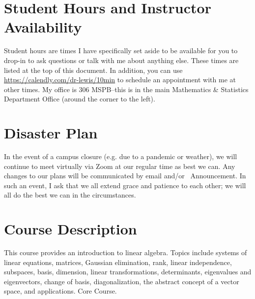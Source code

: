 \documentclass{article}
\begin{document}
\section*{\fontsize{12}{15}\selectfont Student Hours and Instructor Availability}

Student  hours are times I have specifically set aside to be available for you to drop-in to ask questions or talk with me about anything else. 
These times are listed at the top of this document. 
In addition, you can use \url{https://calendly.com/dr-lewis/10min} to schedule an appointment with me at other times. 
My office is 306 MSPB--this is in the main Mathematics \& Statistics Department Office (around the corner to the left).

\section*{\fontsize{12}{15}\selectfont Disaster Plan}
In the event of a campus closure (e.g. due to a pandemic or weather), we will continue to meet virtually via Zoom at our regular time as best we can. Any changes to our plans will be communicated by email and/or \LMS\ Announcement. In such an event, I ask that we all extend grace and patience to each other; we will all do the best we can in the circumstances.

\section*{\fontsize{12}{15}\selectfont Course Description}
This course provides an introduction to linear algebra. Topics include systems of linear equations, matrices, Gaussian elimination, rank, linear independence, subspaces, basis, dimension, linear transformations, determinants, eigenvalues and eigenvectors, change of basis, diagonalization, the abstract concept of a vector space, and applications. Core Course.
\end{document}
